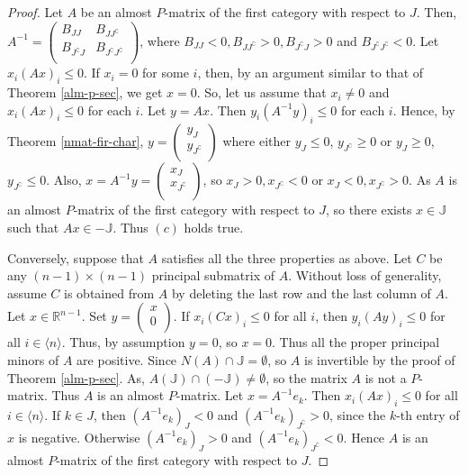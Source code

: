 \documentclass[11pt]{article}
\begin{document}
 \begin{proof}
Let $A$ be an almost $P$-matrix of the first category with respect to $J$. Then,
$A^{-1} = \begin{pmatrix}
            B_{JJ} & B_{J J^\complement} \\
B_{J^\complement J} & B_{J^\complement J^\complement}\\
            \end{pmatrix}$, where $B_{JJ} < 0, B_{J J^\complement} >0, B_{J^\complement J} > 0$ and $ B_{J^\complement J^\complement} < 0$. Let  $x_i(Ax)_i \leq 0.$ If $x_i =0$ for some $i$, then, by an  argument similar to that of Theorem \ref{alm-p-sec}, we get $x=0$.  So, let us assume that $x_i \neq 0$ and $x_i(Ax)_i \leq 0$ for each $i$. Let $y=Ax$. Then $y_i(A^{-1}y)_i \leq 0$ for each $i$.    Hence, by Theorem \ref{nmat-fir-char}, $y=
\begin{pmatrix}
            y_{J}\\
            y_{J^\complement}\\
            \end{pmatrix} $ where either $y_J \leq 0$, $y_{J^\complement} \geq 0$ or $y_J \geq 0$, $y_{J^\complement} \leq 0$. Also, $x=A^{-1}y = \begin{pmatrix}
            x_J\\
            x_{J^\complement}\\
            \end{pmatrix} $, so $x_J >0, x_{J^\complement} <0$ or $x_J <0, x_{J^\complement} >0.$ As $A$ is an almost $P$-matrix of the first category with respect to $J$, so there exists  $x \in \mathbb{J}$ such that $Ax \in -\mathbb{J}$. Thus $(c)$ holds true.

Conversely, suppose that $A$ satisfies all the three properties as above. Let $C$ be any $(n-1) \times (n-1) $ principal submatrix of $A$. Without loss of generality, assume $C$ is obtained from  $A$ by deleting the last row and the last column of $A$.
Let $x \in \mathbb{R}^{n-1}.$ Set $y= \begin{pmatrix} x\\ 0\\
\end{pmatrix}.$  If $x_i(Cx)_i \leq 0$ for all $i$, then $y_i
(Ay)_i \leq 0$ for all $i \in \langle n \rangle$. Thus, by assumption $y
= 0$, so $x =0$. Thus all the proper principal minors of $A$ are
positive. Since $N(A) \cap \mathbb{J} = \emptyset$, so $A$ is invertible
by the proof of Theorem \ref{alm-p-sec}. As,  $A (\mathbb{J}) \cap
(-\mathbb{J}) \neq \emptyset$, so the matrix $A$ is not  a $P$-matrix.
Thus  $A$ is an almost $P$-matrix. Let $x=A^{-1}e_k$. Then $x_i
(Ax)_i\leq 0$ for all $i\in \langle n \rangle$. If $k\in J$, then
$(A^{-1}e_k)_J<0$ and $(A^{-1}e_k)_{J^\complement}>0$, since the $k$-th
entry of $x$ is negative. Otherwise $(A^{-1}e_k)_J>0$ and
$(A^{-1}e_k)_{J^\complement}<0$. Hence $A$ is an almost $P$-matrix of the
first category with respect to $J$.
\end{proof}
\end{document}

